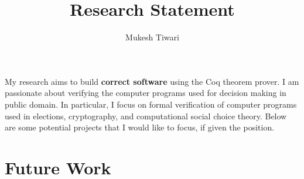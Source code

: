 \documentclass[a4paper]{article}
\title{Research Statement}
\author{Mukesh Tiwari}
\date{}
\begin{document}
\fontsize{11}{15}
\selectfont
\maketitle

My research aims to build \textbf{correct software} 
using the Coq theorem prover. 
I am passionate about verifying the computer programs used for decision making 
in public domain. In particular, 
I focus on formal verification of computer programs used in elections, cryptography, 
and computational social choice theory. Below are some potential projects 
that I would like to focus, if given the position.


\section{Future Work}
\end{document}
